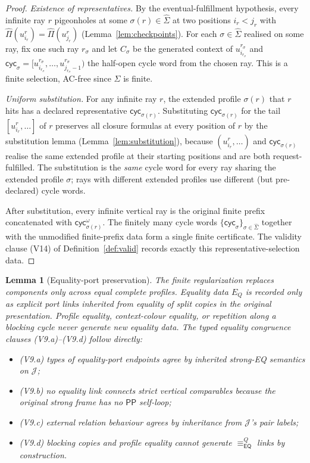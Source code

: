 \documentclass[11pt]{article}
\newtheorem{lemma}[theorem]{Lemma}
\newcommand{\EQ}{\mathsf{EQ}}
\newcommand{\PP}{\mathsf{PP}}
\newcommand{\J}{\mathcal J}
\newcommand{\eqc}{\equiv_{\EQ}}
\newcommand{\extProf}{\widehat\Pi}
\newcommand{\extSigma}{\widehat\Sigma}
\begin{document}
\begin{proof}
\emph{Existence of representatives.}  By the eventual-fulfillment
hypothesis, every infinite ray $r$ pigeonholes at some
$\sigma(r)\in\extSigma$ at two positions $i_r<j_r$ with
$\extProf(u_{i_r}^r)=\extProf(u_{j_r}^r)$
(Lemma~\ref{lem:checkpoints}).  For each
$\sigma\in\extSigma$ realised on some ray, fix one such ray
$r_\sigma$ and let $C_\sigma$ be the generated context of
$u_{i_{r_\sigma}}^{r_\sigma}$ and
$\mathsf{cyc}_\sigma=[u_{i_{r_\sigma}}^{r_\sigma},\ldots,
u_{j_{r_\sigma}-1}^{r_\sigma})$ the half-open cycle word from the
chosen ray.  This is a finite selection, AC-free since $\extSigma$
is finite.

\emph{Uniform substitution.}  For any infinite ray $r$, the
extended profile $\sigma(r)$ that $r$ hits has a declared
representative $\mathsf{cyc}_{\sigma(r)}$.  Substituting
$\mathsf{cyc}_{\sigma(r)}$ for the tail $[u_{i_r}^r,\ldots]$ of $r$
preserves all closure formulas at every position of $r$ by the
substitution lemma (Lemma~\ref{lem:substitution}), because
$(u_{i_r}^r,\ldots)$ and $\mathsf{cyc}_{\sigma(r)}$ realise the
same extended profile at their starting positions and are both
request-fulfilled.  The substitution is the \emph{same} cycle word
for every ray sharing the extended profile $\sigma$; rays with
different extended profiles use different (but pre-declared) cycle
words.

After substitution, every infinite vertical ray is the original
finite prefix concatenated with $\mathsf{cyc}_{\sigma(r)}^\omega$.
The finitely many cycle words
$\{\mathsf{cyc}_\sigma\}_{\sigma\in\extSigma}$ together with the
unmodified finite-prefix data form a single finite certificate.
The validity clause (V14) of Definition~\ref{def:valid} records
exactly this representative-selection data.
\end{proof}

\begin{lemma}[Equality-port preservation]\label{lem:eq-port-preservation}
The finite regularization replaces components only across equal
complete profiles.  Equality data $E_Q$ is recorded only as
explicit port links inherited from equality of split copies in the
original presentation.  Profile equality, context-colour equality,
or repetition along a blocking cycle never generate new equality
data.  The typed equality congruence clauses (V9.a)--(V9.d) follow
directly:
\begin{itemize}
\item (V9.a) types of equality-port endpoints agree by inherited
strong-EQ semantics on $\J$;
\item (V9.b) no equality link connects strict vertical comparables
because the original strong frame has no $\PP$ self-loop;
\item (V9.c) external relation behaviour agrees by inheritance from
$\J$'s pair labels;
\item (V9.d) blocking copies and profile equality cannot generate
$\eqc^Q$ links by construction.
\end{itemize}
\end{lemma}
\end{document}
